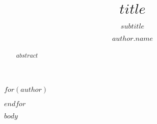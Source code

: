 \documentclass[sigconf,nonacm]{acmart}
\begin{document}
\title{$title$}
\subtitle{$subtitle$}
$for(author)$
  \author{$author.name$}
$endfor$  

\providecommand{\tightlist}{%
  \setlength{\itemsep}{0pt}\setlength{\parskip}{0pt}}

\begin{abstract}
$abstract$
\end{abstract}

\maketitle

$body$



\end{document}
